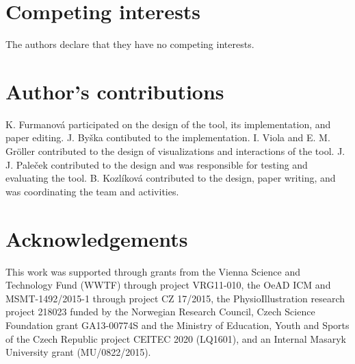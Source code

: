 \documentclass{bmcart}
\begin{document}

\begin{backmatter}

\section*{Competing interests}
  The authors declare that they have no competing interests.

\section*{Author's contributions}
K. Furmanov\'{a} participated on the design of the tool, its implementation, and paper editing.  J. By\v{s}ka contibuted to the implementation. I. Viola and E. M. Gr\"{o}ller contributed to the design of visualizations and interactions of the tool. J. J. Pale\v{c}ek contributed to the design and was responsible for testing and evaluating the tool. B. Kozl\'{i}kov\'{a} contributed to the design, paper writing, and was coordinating the team and activities.

\section*{Acknowledgements}
This work was supported through grants from the Vienna Science and Technology Fund (WWTF) through project VRG11-010, the OeAD ICM and MSMT-1492/2015-1 through project CZ 17/2015, the PhysioIllustration research project 218023 funded by the Norwegian Research Council,  Czech Science Foundation grant GA13-00774S and the Ministry of Education, Youth and Sports of the Czech Republic project CEITEC 2020 (LQ1601), and an Internal Masaryk University grant (MU/0822/2015).


\end{backmatter}
\end{document}
